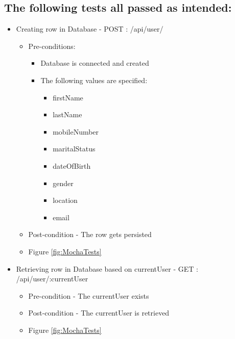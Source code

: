 \documentclass{article}
\begin{document}
\subsection{The following tests all passed as intended:}
\begin{itemize}
\item Creating row in Database - POST : /api/user/ 
	\begin{itemize}
	\item Pre-conditions:
		\begin{itemize}
		\item Database is connected and created
		\item The following values are specified:  
		\begin{itemize}
		\item firstName
  		\item lastName
  		\item mobileNumber 
  		\item maritalStatus 
  		\item dateOfBirth 
 		\item gender
  		\item location 
 		\item email
 		\end{itemize} 
		\end{itemize}
	\item Post-condition - The row gets persisted
	\item Figure \ref{fig:MochaTests}
	\end{itemize}

\item Retrieving row in Database based on currentUser - GET : /api/user/:currentUser
	\begin{itemize}
	\item Pre-condition - The currentUser exists
	\item Post-condition - The currentUser is retrieved 
	\item Figure \ref{fig:MochaTests}
	\end{itemize}
	

\end{itemize}
\end{document}
